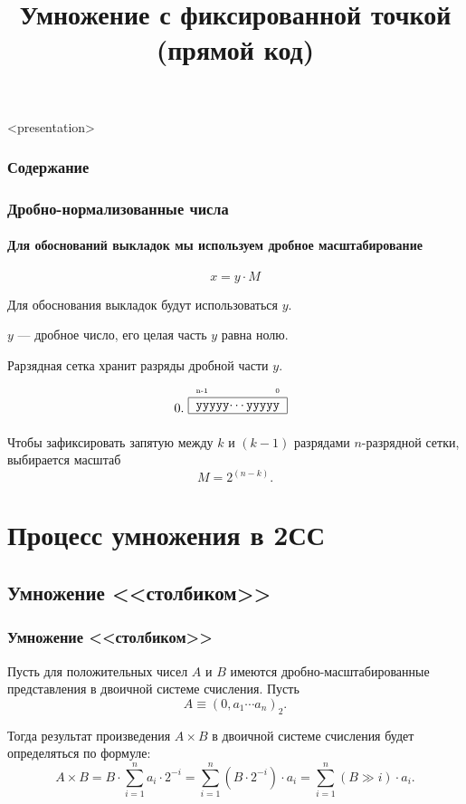 


\title[Умножение в ПК]{Умножение с фиксированной точкой\\(прямой код)}

\setcounter{TaskSimpleCtr}{1}
\newcommand{\TaskSimpleNumber}{ \arabic{TaskSimpleCtr}) \addtocounter{TaskSimpleCtr}{1} }




\begin{frame}<presentation>
    \frametitle{Содержание}
    \tableofcontents
\end{frame}

\begin{frame}
    \frametitle{Дробно-нормализованные числа}
    \framesubtitle{Для обоснований выкладок мы используем дробное масштабирование}
    
    \[x=y\cdot M\]

    Для обоснования выкладок будут использоваться $y$.

    \begin{block}{}
        $y$ --- дробное число, его целая часть $y$ равна нолю.
    \end{block}
    
    Рарзядная сетка хранит разряды дробной части $y$.
    \[
        \raisebox{1.\height}{0.}
        \raisebox{1.\height}{
            \UnsignedAny{n-1}{yyyyy$\cdots$yyyyy}
        }
    \]
    
    Чтобы зафиксировать запятую между $k$ и $(k-1)$ разрядами $n$-разрядной сетки, выбирается масштаб
    \[
        M=2^{(n-k)}.
    \]
\end{frame}

\section{Процесс умножения в 2СС}


\subsection{Умножение <<столбиком>>}
\begin{frame}
    \frametitle{Умножение <<столбиком>>}
    
    Пусть для положительных чисел $A$ и $B$ имеются дробно-масштабированные представления в двоичной системе счисления. Пусть
    \[
        A\equiv(0,a_{1}\cdots a_{n})_2.
    \]

    Тогда результат произведения $A\times B$ в двоичной системе счисления будет определяться по формуле:
    \[
        A\times B = B\cdot\sum_{i=1}^{n} a_{i}\cdot 2^{-i} = \sum_{i=1}^{n} (B\cdot 2^{-i})\cdot a_i = \sum_{i=1}^{n} (B \gg i)\cdot a_i.
    \]
\end{frame}

